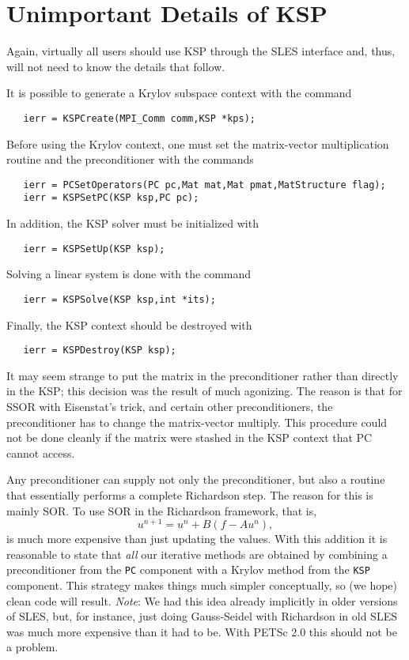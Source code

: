 \section{Unimportant Details of KSP}

Again, virtually all users should use KSP through the SLES interface
and, thus, will not need to know the details that follow. 

It is possible to generate a Krylov subspace context with the 
command 
\begin{verbatim}
   ierr = KSPCreate(MPI_Comm comm,KSP *kps);
\end{verbatim}
Before using the Krylov context, one must set the matrix-vector multiplication routine and
the preconditioner with the 
commands  
\begin{verbatim}
   ierr = PCSetOperators(PC pc,Mat mat,Mat pmat,MatStructure flag);
   ierr = KSPSetPC(KSP ksp,PC pc);
\end{verbatim}
In addition, the KSP solver must be initialized with 
\begin{verbatim}
   ierr = KSPSetUp(KSP ksp);
\end{verbatim}
Solving a linear system is done with the command 
\begin{verbatim}
   ierr = KSPSolve(KSP ksp,int *its);
\end{verbatim}
Finally, the KSP context should be destroyed with 
\begin{verbatim}
   ierr = KSPDestroy(KSP ksp);
\end{verbatim}

It may seem strange to put the matrix in the preconditioner rather
than directly in the KSP; this decision was the result of much
agonizing. The reason is that for SSOR with Eisenstat's trick, and 
certain other preconditioners, the
preconditioner has to change the matrix-vector multiply.  This 
procedure could not
be done cleanly if the matrix were stashed in the KSP context that
PC cannot access.

Any preconditioner can supply not 
only the preconditioner, but also a routine that essentially performs a
complete Richardson step. The reason for this is mainly SOR. To 
use SOR in the Richardson framework, that is,
\[
  u^{n+1} = u^{n} + B(f - A u^{n}), 
\]
is much more expensive than just updating the values.
With this addition it is reasonable to state that {\em all} our
iterative methods are obtained by combining a preconditioner from 
the {\tt PC} component with a Krylov method from the {\tt KSP}
component. This strategy makes things much simpler conceptually, so 
(we hope)
clean code will result. {\em Note}: We had this idea already implicitly in 
older versions of SLES, but, for instance, just doing Gauss-Seidel
with Richardson in old SLES was much more expensive than it had to be. 
With PETSc 2.0 this should not be a problem. 

